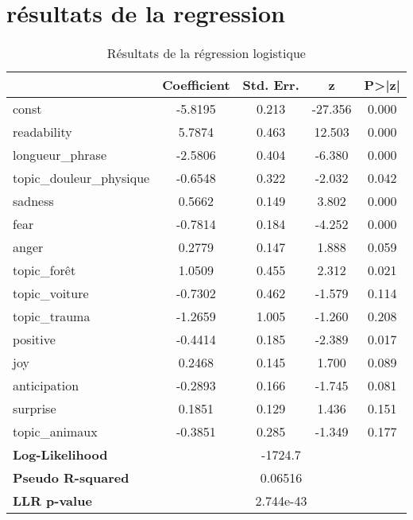 \documentclass[12pt,a4paper,oneside,titlepage]{book} %
\begin{document}
\section{résultats de la regression}
\begin{table}[htbp]
	\centering
	\caption{Résultats de la régression logistique}
	\begin{tabular}{lcccc}
		\toprule
		& \textbf{Coefficient} & \textbf{Std. Err.} & \textbf{z} & \textbf{P>|z|} \\
		\midrule
		const                        & -5.8195 & 0.213 & -27.356 & 0.000 \\
		readability & 5.7874  & 0.463 & 12.503  & 0.000 \\
		longueur\_phrase             & -2.5806 & 0.404 & -6.380  & 0.000 \\
		topic\_douleur\_physique                     & -0.6548 & 0.322 & -2.032  & 0.042 \\
		sadness                      & 0.5662  & 0.149 & 3.802   & 0.000 \\
		fear                         & -0.7814 & 0.184 & -4.252  & 0.000 \\
		anger                        & 0.2779  & 0.147 & 1.888   & 0.059 \\
		topic\_forêt                     & 1.0509  & 0.455 & 2.312   & 0.021 \\
		topic\_voiture                   & -0.7302 & 0.462 & -1.579  & 0.114 \\
		topic\_trauma                 & -1.2659 & 1.005 & -1.260  & 0.208 \\
		positive                     & -0.4414 & 0.185 & -2.389  & 0.017 \\
		joy                          & 0.2468  & 0.145 & 1.700   & 0.089 \\
		anticipation                 & -0.2893 & 0.166 & -1.745  & 0.081 \\
		surprise                     & 0.1851  & 0.129 & 1.436   & 0.151 \\
		topic\_animaux                     & -0.3851 & 0.285 & -1.349  & 0.177 \\
		\midrule
		\textbf{Log-Likelihood}      & \multicolumn{4}{c}{-1724.7} \\
		\textbf{Pseudo R-squared}    & \multicolumn{4}{c}{0.06516} \\
		\textbf{LLR p-value}         & \multicolumn{4}{c}{2.744e-43} \\
		\bottomrule
	\end{tabular}
	\label{table:logit}
\end{table}
\end{document}
